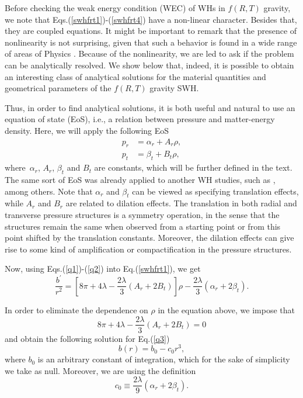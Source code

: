 \documentclass[aps,preprint,onecolumn,11pt,showkeys]{revtex4}%
\begin{document}
Before checking the weak energy condition (WEC) of WHs in $f(R,T)$ gravity, we note that Eqs.(\ref{swhfrt1})-(\ref{swhfrt4}) have a non-linear character. Besides that, they are coupled equations. It might be important to
remark that the presence of nonlinearity is not surprising, given that such a
behavior is found in a wide range of areas of Physics \cite{correa1, correa2,
correa3, correa5, correa7, correa9, correa11, correa12, correa13}. Because of
the nonlinearity, we are led to ask if the problem can be analytically
resolved. We show below that, indeed, it is possible to obtain an interesting
class of analytical solutions for the material quantities and geometrical
parameters of the $f(R,T)$ gravity SWH.

Thus, in order to find analytical solutions, it is both useful and natural to use
an equation of state (EoS), i.e., a relation between pressure and matter-energy density. Here, we will apply the following EoS 
\begin{align}
p_{r} &  =\alpha_{r}+A_{r}\rho,\label{q1}\\
p_{t} &  =\beta_{t}+B_{t}\rho,\label{q2}%
\end{align}
\noindent where\noindent\ $\alpha_{r}$, $A_{r}$, $\beta_{t}$ and $B_{t}$ are
constants, which will be further defined in the text. The same sort of EoS was already applied to another WH studies, such as \cite{azizi/2013,jamil/2013,lobo/2009,zubair/2016b}, among others. Note that $\alpha_{r}$ and $\beta_{t}$ can be viewed as specifying translation effects, while $A_{r}$ and $B_{r}$ are related to dilation effects. The translation in both radial and transverse pressure structures is a symmetry operation, in the sense that the structures
remain the same when observed from a starting point or from this point
shifted by the translation constants. Moreover, the dilation effects can give
rise to some kind of amplification or compactification in the pressure
structures.

Now, using Eqs.(\ref{q1})-(\ref{q2}) into Eq.(\ref{swhfrt1}), we get%
\begin{equation}
\frac{b^{\prime}}{r^{2}}=\left[   8\pi+4\lambda  -\frac
{2\lambda}{3}\left(  A_{r}+2B_{t}\right)  \right]  \rho-\frac{2\lambda}%
{3}\left(  \alpha_{r}+2\beta_{t}\right)  . \label{q3}%
\end{equation}

In order to eliminate the dependence on $\rho$ in the equation above, we
impose that%
\begin{equation}
8\pi+4\lambda-\frac{2\lambda}{3}\left(  A_{r}+2B_{t}\right)  =0 \label{q4}%
\end{equation}
and obtain the following solution for Eq.(\ref{q3})%
\begin{equation}
b(r)=b_{0}-c_{0}r^{3}, \label{q5}%
\end{equation}
\noindent where $b_{0}$ is an arbitrary constant of integration, which for the
sake of simplicity we take as null. Moreover, we are using the definition%
\begin{equation}
c_{0}\equiv\frac{2\lambda}{9}\left(  \alpha_{r}+2\beta_{t}\right)  .
\label{q6}%
\end{equation}
\end{document}
